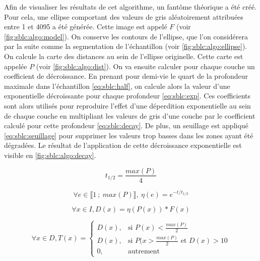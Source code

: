 \documentclass[\main/main.tex]{subfiles}
\begin{document}
%
Afin de visualiser les résultats de cet algorithme, un fantôme théorique a été créé.
%
Pour cela, une ellipse comportant des valeurs de gris 
aléatoirement attribuées entre 1 et 4095 a été générée.
%
Cette image est appelé $F$ (voir \autoref{fig:sblc:algo:model}).
%
On conserve les contours de l'ellipse, que l'on considérera par la suite comme la segmentation de l'échantillon (voir \autoref{fig:sblc:algo:ellipse}).
%
On calcule la carte des distances au sein de l'ellipse originelle.
%
Cette carte est appelée $P$ (voir \autoref{fig:sblc:algo:dist}).
%
On va ensuite calculer pour chaque couche un coefficient de décroissance.
%
En prenant pour demi-vie le quart de la profondeur maximale dans l'échantillon \eqref{eq:sblc:half}, on calcule alors la valeur d'une exponentielle décroissante pour chaque profondeur \eqref{eq:sblc:exp}.
%
Ces coefficients sont alors utilisés pour reproduire l'effet d'une déperdition exponentielle au sein de chaque couche en multipliant les valeurs de gris d'une couche par le coefficient calculé pour cette profondeur \eqref{eq:sblc:decay}.
%
De plus, un seuillage est appliqué \eqref{eq:sblc:seuillage} pour supprimer les valeurs trop basses dans les zones ayant été dégradées.
%
Le résultat de l'application de cette décroissance exponentielle est visible en \autoref{fig:sblc:algo:decay}.

\begin{equation}
    \label{eq:sblc:half}
    t_{1/2} = \frac{max(P)}{4}
\end{equation}

\begin{equation}
    \label{eq:sblc:exp}
    \forall{} e \in \llbracket 1~;~max(P) \rrbracket,~\eta(e) = e^{- t/ t_{1/2}}
\end{equation}

\begin{equation}
    \label{eq:sblc:decay}
    \forall{} x \in I, D(x) =\eta{}(P(x)) * F(x)
\end{equation}

\begin{equation}
    \label{eq:sblc:seuillage}
    \forall{} x \in D, T(x) = 
    \begin{cases}
        D(x), & \text{si } P(x) < \frac{max(P)}{2} \\
        D(x), & \text{si } P(x > \frac{max(P)}{2} \text{ et } D(x) > 10\\
        0, & \text{autrement}
    \end{cases}
\end{equation}
\end{document}

